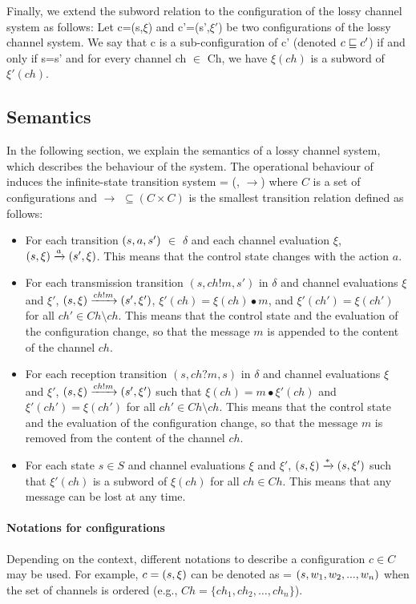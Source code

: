 Finally, we extend the subword relation to the configuration of the lossy channel system as follows: Let c=(s,$\xi$) and c'=(s',$\xi'$) be two configurations of the lossy channel system. We say that c is a sub-configuration of c' (denoted  $c \sqsubseteq c'$) if and only if s=s' and for every channel ch $\in$ Ch, we have $\xi(ch)$ is a subword of $\xi'(ch)$.

\subsection{Semantics}
\label{LTS}
In the following section, we explain the semantics of a lossy channel system, which describes the behaviour of the system. The operational behaviour of  induces the infinite-state transition system  = (, $\rightarrow$) where $C$ is a set of configurations and $\rightarrow$ $\subseteq (C \times C)$ is the smallest transition relation defined as follows:
  \begin{itemize}
    \item For each transition $(s, a, s')$ $\in$ $\delta$ and each channel evaluation $\xi$, $(s, \xi) \xrightarrow{a} (s', \xi)$. This means that the control state changes with the action $a$.
    \item For each transmission transition $( s, ch!m, s' )$ in $\delta$ and channel evaluations $\xi$ and $\xi'$, $(s, \xi) \xrightarrow{ch!m} (s', \xi')$, $\xi'(ch) = \xi(ch)\bullet m$, and $\xi'(ch')=\xi(ch')$ for all $ch' \in Ch \setminus ch$. This means that the control state and the evaluation of the configuration change, so that the message $m$ is appended to the content of the channel $ch$.
    \item For each reception transition $( s, ch?m, s )$ in $\delta$ and channel evaluations $\xi$ and $\xi'$, $(s, \xi) \xrightarrow{ch!m} (s', \xi')$ such that $\xi(ch)=m \bullet \xi'(ch) $ and $\xi'(ch')=\xi(ch')$ for all $ch' \in Ch \setminus ch$. This means that the control state and the evaluation of the configuration change, so that the message $m$ is removed from the content of the channel $ch$.
    \item For each state $s \in S$ and channel evaluations $\xi$ and $\xi'$, $(s, \xi) \xrightarrow{*} (s, \xi')$ such that $\xi'(ch)$ is a subword of $\xi(ch)$ for all $ch \in Ch$. This means that any message can be lost at any time.
  \end{itemize}

\paragraph{Notations for configurations}
Depending on the context, different notations to describe a configuration $c\in C$ may be used. For example, $c = (s, \xi)$ can be denoted as  = $(s, w_1, w_2, ..., w_n)$ when the set of channels is ordered (e.g., $Ch=\{ch_1,ch_2, \ldots,ch_n\}$).

